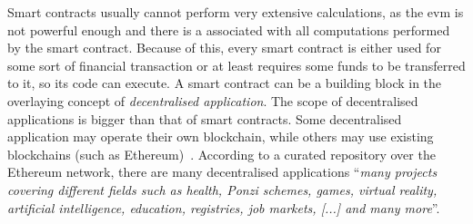 Smart contracts usually cannot perform very extensive calculations, as the \acrshort{evm} is not powerful enough and there is a associated with all computations performed by the smart contract. Because of this, every smart contract is either used for some sort of financial transaction or at least requires some funds to be transferred to it, so its code can execute. A smart contract can be a building block in the overlaying concept of \textit{decentralised application}. The scope of decentralised applications is bigger than that of smart contracts. Some decentralised application may operate their own blockchain, while others may use existing blockchains (such as Ethereum)~\cite{AlyssaHertigWhatCoinDesk}. According to a curated repository over the Ethereum network, there are many decentralised applications ``\textit{many projects covering different fields such as health, Ponzi schemes, games, virtual reality, artificial intelligence, education, registries, job markets, [...] and many more}''\footnotemark. 

